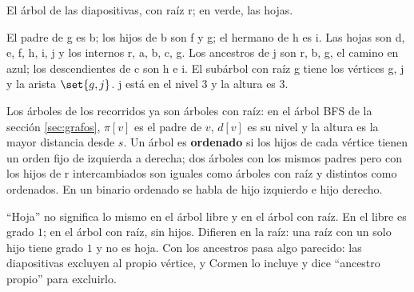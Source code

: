 \documentclass[11pt,letterpaper]{article}
\begin{document}
\begin{ejemplo}
  \label{ej:arbol-vocabulario}
  El árbol de las diapositivas, con raíz r; en verde, las hojas.
  \begin{center}
  \end{center}
  El padre de g es b; los hijos de b son f y g; el hermano de h es i.
  Las hojas son d, e, f, h, i, j y los internos r, a, b, c, g. Los
  ancestros de j son r, b, g, el camino en azul; los descendientes de
  c son h e i. El subárbol con raíz g tiene los vértices g, j y la
  arista $\set{g, j}$. j está en el nivel $3$ y la altura es $3$.
\end{ejemplo}

Los árboles de los recorridos ya son árboles con raíz: en el árbol BFS
de la sección \ref{sec:grafos}, $\pi[v]$ es el padre de $v$, $d[v]$ es
su nivel y la altura es la mayor distancia desde $s$. Un árbol es
\textbf{ordenado} si los hijos de cada vértice tienen un orden fijo
de izquierda a derecha; dos árboles con los mismos padres pero con los
hijos de r intercambiados son iguales como árboles con raíz y
distintos como ordenados. En un binario ordenado se habla de hijo
izquierdo e hijo derecho.

\begin{ojo}
  ``Hoja'' no significa lo mismo en el árbol libre y en el árbol con
  raíz. En el libre es grado $1$; en el árbol con raíz, sin hijos.
  Difieren en la raíz: una raíz con un solo hijo tiene grado $1$ y no
  es hoja. Con los ancestros pasa algo parecido: las diapositivas
  excluyen al propio vértice, y Cormen lo incluye y dice ``ancestro
  propio'' para excluirlo.
\end{ojo}
\end{document}
